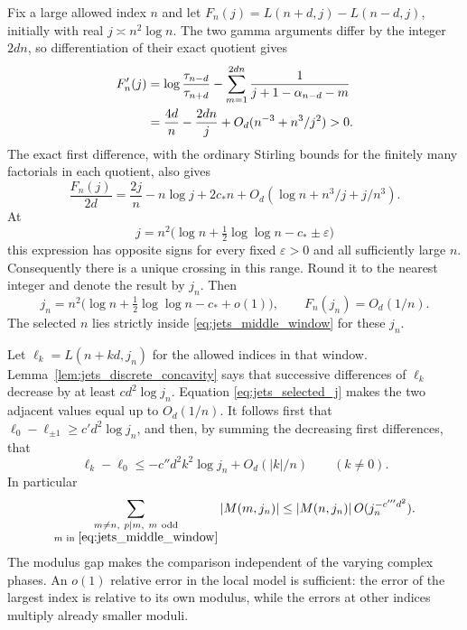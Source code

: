 \documentclass[11pt]{article}
\numberwithin{equation}{section}
\theoremstyle{definition}
\newcommand{\eps}{\varepsilon}
\begin{document}
Fix a large allowed index $n$ and let
$F_n(j)=L(n+d,j)-L(n-d,j)$, initially with real
$j\asymp n^2\log n$. The two gamma arguments differ by the
integer $2dn$, so differentiation of their exact quotient gives
\begin{align}
 F_n'(j)
 &=\log\frac{\tau_{n-d}}{\tau_{n+d}}
    -\sum_{m=1}^{2dn}\frac1{j+1-\alpha_{n-d}-m}\notag\\
 &=\frac{4d}{n}-\frac{2dn}{j}
    +O_d(n^{-3}+n^3/j^2)>0.
 \label{eq:jets_crossing_derivative}
\end{align}
The exact first difference, with the ordinary Stirling bounds for
the finitely many factorials in each quotient, also gives
\begin{equation}\label{eq:jets_crossing_expansion}
 \frac{F_n(j)}{2d}=\frac{2j}{n}-n\log j+2c_*n
       +O_d(\log n+n^3/j+j/n^3).
\end{equation}
At
\[
 j=n^2\bigl(\log n+\tfrac12\log\log n-c_*\pm\eps\bigr)
\]
this expression has opposite signs for every fixed $\eps>0$ and
all sufficiently large $n$. Consequently there is a unique
crossing in this range. Round it to the nearest integer and denote
the result by $j_n$. Then
\begin{equation}\label{eq:jets_selected_j}
 j_n=n^2\bigl(\log n+\tfrac12\log\log n-c_*+o(1)\bigr),
 \qquad F_n(j_n)=O_d(1/n).
\end{equation}
The selected $n$ lies strictly inside
\eqref{eq:jets_middle_window} for these $j_n$.

Let $\ell_k=L(n+kd,j_n)$ for the allowed indices in that window.
Lemma~\ref{lem:jets_discrete_concavity} says that successive
differences of $\ell_k$ decrease by at least $c d^2\log j_n$.
Equation \eqref{eq:jets_selected_j} makes the two adjacent values
equal up to $O_d(1/n)$. It follows first that
$\ell_0-\ell_{\pm1}\ge c'd^2\log j_n$, and then, by summing
the decreasing first differences, that
\[
 \ell_k-\ell_0\le -c''d^2 k^2\log j_n+O_d(|k|/n)
 \qquad(k\ne0).
\]
In particular
\begin{equation}\label{eq:jets_single_index}
 \sum_{\substack{m\ne n,\ p\mid m,\ m\ \mathrm{odd}\\
                  m\text{ in }\eqref{eq:jets_middle_window}}}
 |M(m,j_n)|
 \le |M(n,j_n)|\,O(j_n^{-c'''d^2}).
\end{equation}
The modulus gap makes the comparison independent of the varying complex
phases. An $o(1)$ relative error in the local model is
sufficient: the error of the largest index is relative to its own
modulus, while the errors at other indices multiply already
smaller moduli.
\end{document}
